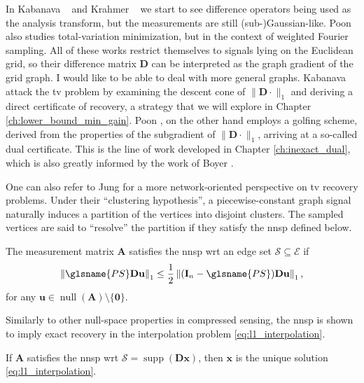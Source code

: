 In Kabanava \etal~\cite{kabanava2015a} and Krahmer \etal~\cite{krahmer2017} we start to see difference operators being used as the analysis transform, but the measurements are still (sub-)Gaussian-like. Poon \cite{poon2015} also studies total-variation minimization, but in the context of weighted Fourier sampling. All of these works restrict themselves to signals lying on the Euclidean grid, so their difference matrix $\mathbf{D}$ can be interpreted as the graph gradient of the grid graph. I would like to be able to deal with more general graphs. Kabanava \etal \cite{kabanava2015a} attack the \acrlong{tv} problem by examining the descent cone of $\|\mathbf{D} \cdot\|_1$ and deriving a direct certificate of recovery, a strategy that we will explore in Chapter \ref{ch:lower_bound_min_gain}. Poon \cite{poon2015}, on the other hand employs a golfing scheme, derived from the properties of the subgradient of $\|\mathbf{D} \cdot\|_1$, arriving at a so-called dual certificate. This is the line of work developed in Chapter \ref{ch:inexact_dual}, which is also greatly informed by the work of Boyer \etal \cite{boyer2019}.

One can also refer to Jung \etal \cite{jung2016, jung2017, jung2018} for a more network-oriented perspective on \acrlong{tv} recovery problems. Under their ``clustering hypothesis'', a piecewise-constant graph signal naturally induces a partition of the vertices into disjoint clusters. The sampled vertices are said to ``resolve'' the partition if they satisfy the \acrlong{nnsp} defined below.

\begin{definition}
    The measurement matrix $\mathbf{A}$ satisfies the \acrshort{nnsp} \acrlong{wrt} an edge set $\mathcal{S} \subseteq \mathcal{E}$ if
    \begin{equation}
        \left \| \glsname{PS} \mathbf{D u} \right \|_1 \leq \frac{1}{2} \left \| (\mathbf{I}_n - \glsname{PS}) \mathbf{D u} \right \|_1,
    \end{equation}
    for any $\mathbf{u} \in \operatorname{null} \left ( \mathbf{A} \right ) \setminus \{ \mathbf{0} \}$.
\end{definition}

Similarly to other null-space properties in compressed sensing, the \acrshort{nnsp} is shown to imply exact recovery in the interpolation problem \eqref{eq:l1_interpolation}.

\begin{proposition}
    If $\mathbf{A}$ satisfies the \acrshort{nnsp} \acrshort{wrt} $\mathcal{S} = \operatorname{supp}\left ( \mathbf{D x} \right )$, then $\mathbf{x}$ is the unique solution \eqref{eq:l1_interpolation}.
\end{proposition}

